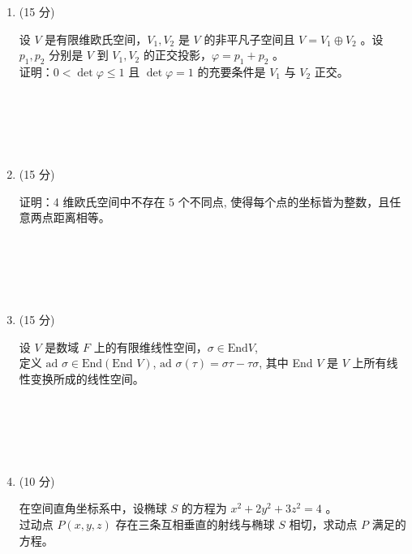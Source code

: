 \documentclass{article}
\begin{document}
\begin{enumerate}
    \item (15 分) 
    \begin{tcolorbox}[colframe=purple!50!black, colback=purple!5!white]
    设 $V$ 是有限维欧氏空间，$V_{1}, V_{2}$ 是 $V$ 的非平凡子空间且 $V=V_{1} \oplus V_{2}$ 。设 $p_{1}, p_{2}$ 分别是 $V$ 到 $V_{1}, V_{2}$ 的正交投影，$\varphi=p_{1}+p_{2}$ 。\\
    证明：$0<\operatorname{det} \varphi \leq 1$ 且 $\operatorname{det} \varphi=1$ 的充要条件是 $V_{1}$ 与 $V_{2}$ 正交。
    \end{tcolorbox} \\\\\\\\
    
    \item (15 分) 
    \begin{tcolorbox}[colframe=orange!50!black, colback=orange!5!white]
    证明：4 维欧氏空间中不存在 5 个不同点, 使得每个点的坐标皆为整数，且任意两点距离相等。
    \end{tcolorbox} \\\\\\\\
    
    \item (15 分) 
    \begin{tcolorbox}[colframe=cyan!50!black, colback=cyan!5!white]
    设 $V$ 是数域 $F$ 上的有限维线性空间，$\sigma \in \text{End} V$,\\
    定义 $\text{ad } \sigma \in \text{End}(\text{End } V)$, $\text{ad } \sigma(\tau)=\sigma \tau-\tau \sigma$, 其中 End $V$ 是 $V$ 上所有线性变换所成的线性空间。
    \end{tcolorbox} \\\\\\\\
    
    \item (10 分) 
    \begin{tcolorbox}[colframe=magenta!50!black, colback=magenta!5!white]
    在空间直角坐标系中，设椭球 $S$ 的方程为 $x^{2}+2y^{2}+3z^{2}=4$ 。\\
    过动点 $P(x, y, z)$ 存在三条互相垂直的射线与椭球 $S$ 相切，求动点 $P$ 满足的方程。
    \end{tcolorbox}
\end{enumerate}
\end{document}
